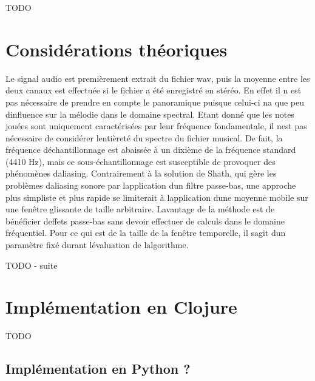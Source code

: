 \documentclass[letterpaper]{article}
\begin{document}
TODO

\citep{SP} \citep{AT} \citep{JP}

\section{Considérations théoriques}

Le signal audio est premièrement extrait du fichier wav, puis la moyenne entre les 
deux canaux est effectuée si le fichier a été enregistré en stéréo. En effet il n\textquotesingle
est pas nécessaire de prendre en compte le panoramique puisque celui-ci n\textquotesingle a que 
peu d\textquotesingle influence sur la mélodie dans le domaine spectral. 
Etant donné que les notes jouées sont uniquement caractérisées par leur fréquence fondamentale,
il n\textquotesingle est pas nécessaire de considérer l\textquotesingle entièreté du spectre
du fichier musical. De fait, la fréquence d\textquotesingle échantillonnage est abaissée à un dixième 
de la fréquence standard (4410 Hz), mais ce sous-échantillonnage est susceptible de provoquer des
phénomènes d\textquotesingle aliasing. Contrairement à la solution de Sh\textquotesingle ath, 
qui gère les problèmes d\textquotesingle aliasing sonore par l\textquotesingle application 
d\textquotesingle un filtre passe-bas, une approche plus simpliste et plus rapide se limiterait à
l\textquotesingle application d\textquotesingle une moyenne mobile sur une fenêtre glissante
de taille arbitraire. L\textquotesingle avantage de la méthode est de bénéficier d\textquotesingle effets
passe-bas sans devoir effectuer de calculs dans le domaine fréquentiel. Pour ce qui est de la taille
de la fenêtre temporelle, il s\textquotesingle agit d\textquotesingle un paramètre fixé durant
l\textquotesingle évaluation de l\textquotesingle algorithme.

TODO - suite

\subsection{}

\section{Implémentation en Clojure}

TODO

\subsection{Implémentation en Python ?}
\end{document}
